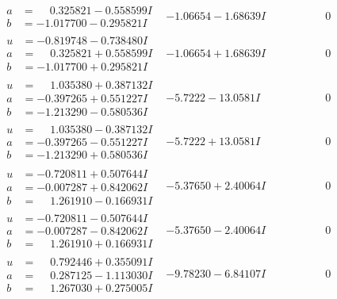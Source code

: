 \documentclass[1p]{elsarticle_modified}
\theoremstyle{definition}
\begin{document}
$$\begin{array}{c|c|c}
\begin{aligned}
a &= \phantom{-}0.325821 - 0.558599 I \\
b &= -1.017700 - 0.295821 I\end{aligned}
 & -1.06654 - 1.68639 I & \phantom{-0.000000 } 0 \\ \hline\begin{aligned}
u &= -0.819748 - 0.738480 I \\
a &= \phantom{-}0.325821 + 0.558599 I \\
b &= -1.017700 + 0.295821 I\end{aligned}
 & -1.06654 + 1.68639 I & \phantom{-0.000000 } 0 \\ \hline\begin{aligned}
u &= \phantom{-}1.035380 + 0.387132 I \\
a &= -0.397265 + 0.551227 I \\
b &= -1.213290 - 0.580536 I\end{aligned}
 & -5.7222 - 13.0581 I & \phantom{-0.000000 } 0 \\ \hline\begin{aligned}
u &= \phantom{-}1.035380 - 0.387132 I \\
a &= -0.397265 - 0.551227 I \\
b &= -1.213290 + 0.580536 I\end{aligned}
 & -5.7222 + 13.0581 I & \phantom{-0.000000 } 0 \\ \hline\begin{aligned}
u &= -0.720811 + 0.507644 I \\
a &= -0.007287 + 0.842062 I \\
b &= \phantom{-}1.261910 - 0.166931 I\end{aligned}
 & -5.37650 + 2.40064 I & \phantom{-0.000000 } 0 \\ \hline\begin{aligned}
u &= -0.720811 - 0.507644 I \\
a &= -0.007287 - 0.842062 I \\
b &= \phantom{-}1.261910 + 0.166931 I\end{aligned}
 & -5.37650 - 2.40064 I & \phantom{-0.000000 } 0 \\ \hline\begin{aligned}
u &= \phantom{-}0.792446 + 0.355091 I \\
a &= \phantom{-}0.287125 - 1.113030 I \\
b &= \phantom{-}1.267030 + 0.275005 I\end{aligned}
 & -9.78230 - 6.84107 I & \phantom{-0.000000 } 0 \\ \hline\begin{aligned}

\end{aligned}
\end{array}$$
\end{document}
